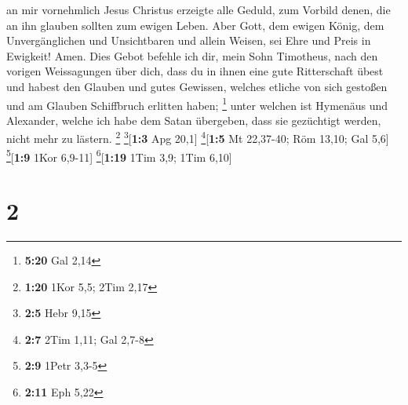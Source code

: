 an mir vornehmlich Jesus Christus erzeigte alle Geduld, zum Vorbild
denen, die an ihn glauben sollten zum ewigen Leben.  Aber
Gott, dem ewigen König, dem Unvergänglichen und Unsichtbaren und allein
Weisen, sei Ehre und Preis in Ewigkeit! Amen.  Dies Gebot
befehle ich dir, mein Sohn Timotheus, nach den vorigen Weissagungen über
dich, dass du in ihnen eine gute Ritterschaft übest  und
habest den Glauben und gutes Gewissen, welches etliche von sich gestoßen
und am Glauben Schiffbruch erlitten haben; \footnote{\textbf{5:20} Gal
  2,14}  unter welchen ist Hymenäus und Alexander, welche
ich habe dem Satan übergeben, dass sie gezüchtigt werden, nicht mehr zu
lästern. \footnote{\textbf{1:20} 1Kor 5,5; 2Tim 2,17}
\footnote{\textbf{2:5} Hebr 9,15}{[}\textbf{1:3} Apg 20,1{]}
\footnote{\textbf{2:7} 2Tim 1,11; Gal 2,7-8}{[}\textbf{1:5} Mt 22,37-40;
Röm 13,10; Gal 5,6{]} \footnote{\textbf{2:9} 1Petr 3,3-5}{[}\textbf{1:9}
1Kor 6,9-11{]} \footnote{\textbf{2:11} Eph 5,22}{[}\textbf{1:19} 1Tim
3,9; 1Tim 6,10{]}

\hypertarget{section-1}{%
\section{2}\label{section-1}}


